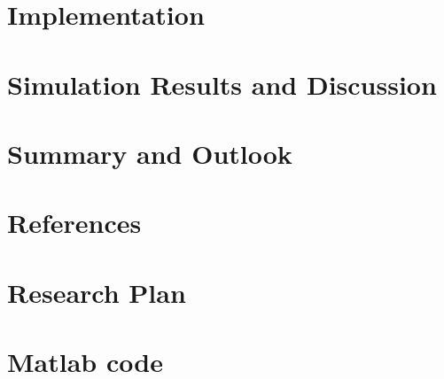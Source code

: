 \documentclass[11pt]{article}
\begin{document}
\section{Implementation}

\section{Simulation Results and Discussion}

\section{Summary and Outlook}

\section{References}


\begin{appendix}

\section{Research Plan}

\section{Matlab code}

\end{appendix}
\end{document}
